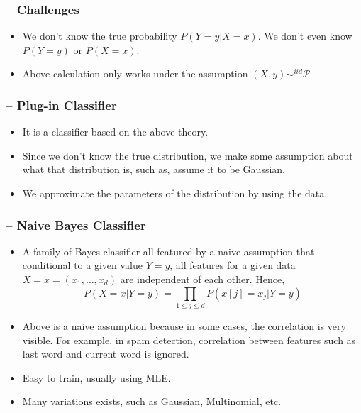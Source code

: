 \documentclass{article}
\begin{document}
\subsubsection{-- Challenges}
\begin{itemize}
    \item We don't know the true probability $P(Y=y|X=x)$. We don't even know $P(Y=y)$ or $P(X=x)$.
    \item Above calculation only works under the assumption $(X,y) \sim^{iid} \mathcal{P}$
\end{itemize}

\subsubsection{-- Plug-in Classifier}
\begin{itemize}
    \item It is a classifier based on the above theory.
    \item Since we don't know the true distribution, we make some assumption about what that distribution is, such as, assume it to be Gaussian.
    \item We approximate the parameters of the distribution by using the data.
\end{itemize}

\subsubsection{-- Naive Bayes Classifier}
\begin{itemize}
    \item A family of Bayes classifier all featured by a naive assumption that conditional to a given value $Y=y$, all features for a given data $X=x=(x_1, \dots, x_d)$ are independent of each other. Hence,
        \begin{equation*}
            P(X=x|Y=y) =  \prod_{1 \leq j \leq d} P(x[j] = x_j | Y = y)
        \end{equation*}
    \item Above is a naive assumption because in some cases, the correlation is very visible. For example, in spam detection, correlation between features such as last word and current word is ignored.
    \item Easy to train, usually using MLE.
    \item Many variations exists, such as Gaussian, Multinomial, etc.
\end{itemize}

\end{document}
